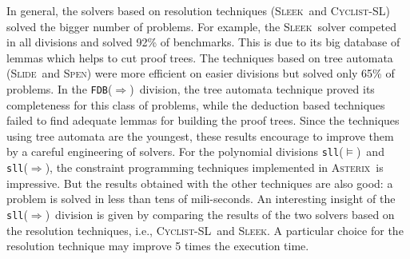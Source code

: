 \documentclass[twoside,11pt]{article}
\newcommand{\limp}{\Rightarrow}
\newcommand{\sllsat}{\texttt{sll}($\models$)}
\newcommand{\sllent}{\texttt{sll}($\limp$)}
\newcommand{\FDBent}{\texttt{FDB}($\limp$)}
\newcommand{\ASTERIX}{\textsc{Asterix}}
\newcommand{\CYCLIST}{\textsc{Cyclist-SL}}
\newcommand{\SLEEK}{\textsc{Sleek}}
\newcommand{\SLIDE}{\textsc{Slide}}
\newcommand{\SPEN}{\textsc{Spen}}
\begin{document}
In general, the solvers based on resolution techniques (\SLEEK\ and \CYCLIST) solved the bigger number of problems.
For example, the \SLEEK\ solver competed in all divisions and solved 92\% of benchmarks. This is due to its big database of lemmas which helps to cut proof trees.
%
The techniques based on tree automata (\SLIDE\ and \SPEN) were more efficient on easier divisions but solved only 65\% of problems. In the \FDBent\ division, the tree automata technique proved its completeness for this class of problems, while the deduction based techniques failed to find adequate lemmas for building the proof trees. 
Since the techniques using tree automata are the youngest, these results encourage to improve them by a careful engineering of solvers.
For the polynomial divisions \sllsat\ and \sllent, the constraint programming techniques implemented in \ASTERIX\  is impressive. But the results obtained with the other techniques are also good: a problem is solved in less than tens of mili-seconds. 
An interesting insight of the \sllent\ division is given by comparing the results of the two solvers based on the resolution techniques, i.e., \CYCLIST\ and \SLEEK. A particular choice for the resolution technique may improve 5 times the execution time.


%
%
\end{document}
